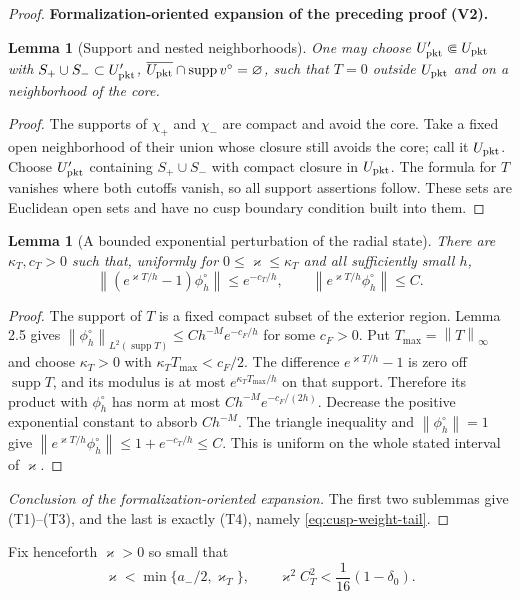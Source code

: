 \documentclass[11pt]{article}
\newtheorem{lemma}[theorem]{Lemma}
\newcommand{\formalisationparentid}{X}
\newenvironment{formalisationaddition}[1]{\par\medskip\begingroup\color{blue}\def\formalisationparentid{#1}\setcounter{formalizationsublemma}{0}\let\lemma\formalizationsublemma\let\endlemma\endformalizationsublemma
  \def\Eo{\mathcal E_h^\circ}\def\EE{\mathcal E_h}\def\phio{\phi_h^\circ}\def\phih{\phi_h}\def\Ho{H_h^{\rm atom}(v^\circ)}\def\Ha{H_h^{\rm atom}}\def\HL{H_h^{L}}\def\Dh{D_h}\def\Log{\operatorname{Log}}\def\ellh{\ell_h}\def\Gp{G_{p,h}}\def\Ast{A_{*,h}}\def\ahat{\widehat{\mathfrak a}_h}\def\ah{\mathfrak a_h}\def\rh{\widehat\rho_h}\def\deltah{\widehat\delta_h}\def\oldref##1{\textup{(##1)}}\def\interface##1{\par\noindent\textit{Analytical interface used here.} ##1\par}\def\finish{\par\noindent\textit{Conclusion of the formalization-oriented expansion.} }\par\noindent\textbf{Formalization-oriented expansion of the preceding proof (V2).}\par\smallskip
}{\par\endgroup\medskip
}
\newcommand{\norm}[1]{\left\|#1\right\|}
\newcommand{\supp}{\operatorname{supp}}
\begin{document}
\begin{proof}
\begin{formalisationaddition}{LA.1}
\begin{lemma}[Support and nested neighborhoods]\label{sublemma:LA-1-neighborhoods}
One may choose $U'_{\rm pkt}\Subset U_{\rm pkt}$ with $S_+\cup S_-\subset U'_{\rm pkt}$, $\overline{U_{\rm pkt}}\cap\supp v^\circ=\varnothing$, such that $T=0$ outside $U_{\rm pkt}$ and on a neighborhood of the core.
\end{lemma}
\begin{proof}
The supports of $\chi_+$ and $\chi_-$ are compact and avoid the core. Take a fixed open neighborhood of their union whose closure still avoids the core; call it $U_{\rm pkt}$. Choose $U'_{\rm pkt}$ containing $S_+\cup S_-$ with compact closure in $U_{\rm pkt}$. The formula for $T$ vanishes where both cutoffs vanish, so all support assertions follow. These sets are Euclidean open sets and have no cusp boundary condition built into them.
\end{proof}

\begin{lemma}[A bounded exponential perturbation of the radial state]\label{sublemma:LA-1-exponential}
There are $\kappa_T,c_T>0$ such that, uniformly for $0\le\varkappa\le\kappa_T$ and all sufficiently small $h$,
\[
 \norm{(e^{\varkappa T/h}-1)\phio}\le e^{-c_T/h},\qquad
 \norm{e^{\varkappa T/h}\phio}\le C.
\]
\end{lemma}
\begin{proof}
The support of $T$ is a fixed compact subset of the exterior region. Lemma 2.5 gives $\norm{\phio}_{L^2(\supp T)}\le Ch^{-M}e^{-c_F/h}$ for some $c_F>0$. Put $T_{\max}=\norm T_\infty$ and choose $\kappa_T>0$ with $\kappa_TT_{\max}<c_F/2$. The difference $e^{\varkappa T/h}-1$ is zero off $\supp T$, and its modulus is at most $e^{\kappa_TT_{\max}/h}$ on that support. Therefore its product with $\phio$ has norm at most $Ch^{-M}e^{-c_F/(2h)}$. Decrease the positive exponential constant to absorb $Ch^{-M}$. The triangle inequality and $\norm{\phio}=1$ give $\norm{e^{\varkappa T/h}\phio}\le1+e^{-c_T/h}\le C$. This is uniform on the whole stated interval of $\varkappa$.
\end{proof}
\finish The first two sublemmas give (T1)--(T3), and the last is exactly (T4), namely \eqref{eq:cusp-weight-tail}.
\end{formalisationaddition}

\end{proof}

Fix henceforth $\varkappa>0$ so small that
\begin{equation}\label{eq:kappa-weight}
 \varkappa<\min\{a_-/2,\varkappa_T\},
 \qquad \varkappa^2C_T^2<\frac1{16}(1-\delta_0).
\end{equation}
\end{document}
